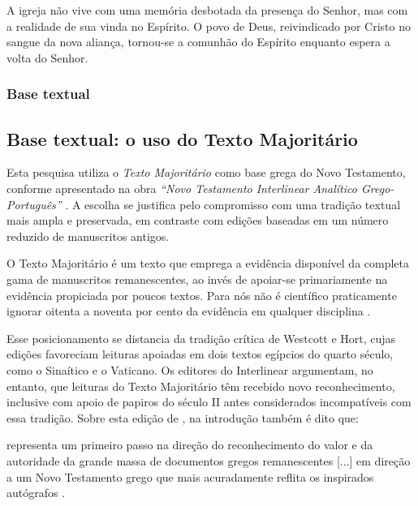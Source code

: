 \begin{citacao}
    A igreja não vive com uma memória desbotada da presença do Senhor, mas com a realidade de sua vinda no Espírito. O povo de Deus, reivindicado por Cristo no sangue da nova aliança, tornou-se a comunhão do Espírito enquanto espera a volta do Senhor. \cite[p.~46]{clowney2007}
\end{citacao}

\subsubsection{Base textual}

\subsection{Base textual: o uso do Texto Majoritário}

Esta pesquisa utiliza o \textit{Texto Majoritário} como base grega do Novo Testamento, conforme apresentado na obra \textit{``Novo Testamento Interlinear Analítico Grego-Português''} \cite{interlinear2008}. A escolha se justifica pelo compromisso com uma tradição textual mais ampla e preservada, em contraste com edições baseadas em um número reduzido de manuscritos antigos.

\begin{citacao}
    O Texto Majoritário é um texto que emprega a evidência disponível da completa gama de manuscritos remanescentes, ao invés de apoiar-se primariamente na evidência propiciada por poucos textos. Para nós não é científico praticamente ignorar oitenta a noventa por cento da evidência em qualquer disciplina \cite[p.~ix]{interlinear2008}.
\end{citacao}

Esse posicionamento se distancia da tradição crítica de Westcott e Hort, cujas edições favoreciam leituras apoiadas em dois textos egípcios do quarto século, como o Sinaítico e o Vaticano. Os editores do Interlinear argumentam, no entanto, que leituras do Texto Majoritário têm recebido novo reconhecimento, inclusive com apoio de papiros do século II antes considerados incompatíveis com essa tradição. Sobre esta edição de , na introdução também é dito que:

\begin{citacao}
    representa um primeiro passo na direção do reconhecimento do valor e da autoridade da grande massa de documentos gregos remanescentes [...] em direção a um Novo Testamento grego que mais acuradamente reflita os inspirados autógrafos \cite[p.~xiii]{interlinear2008}.
\end{citacao}

